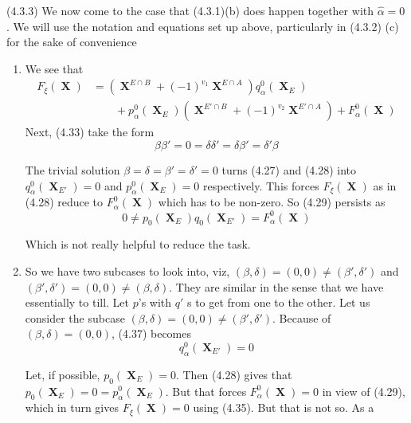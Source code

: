 \documentclass[a4paper,12pt]{article}
\DeclareMathOperator{\x}{\mathrm{X}}
\theoremstyle{definition}
\theoremstyle{underlinethm}
\theoremstyle{definition}
\begin{document}
\begin{enumerate}[label=(\alph*)]
(4.3.3) We now come to the case that (4.3.1)(b) does happen together with $\hat{\alpha} =0$. We will use the notation and equations set up above, particularly in (4.3.2) (c) for the sake of convenience 
\begin{enumerate}[label=(\alph*)]
\item We see that
\begin{align*}
F_{\xi}(\boldsymbol{\x})& = \left(\boldsymbol{\x}^{E \cap B}  + (-1)^{v_{1}} \boldsymbol{\x}^{E \cap A}\right) q_{\alpha}^{0} (\boldsymbol{\x}_{E})\\
 &\qquad + p_{\alpha}^{0} (\boldsymbol{\x}_{E}) (\boldsymbol{\x}^{E' \cap B} + (-1)^{v_{2}} \boldsymbol{\x}^{E' \cap A}) + F_{\alpha}^{0}(\boldsymbol{\x})\tag{4.35}\label{eq-4.35}
\end{align*}
 Next, (4.33) take the form
 \begin{equation}
 \beta\beta' = 0 = \delta\delta' = \delta \beta' = \delta'\beta\tag{4.36}\label{eq-4.36}
 \end{equation}

The trivial solution $\beta = \delta = \beta' = \delta' = 0$ turns  (4.27) and (4.28) into $q_{\alpha}^{0} (\boldsymbol{\x}_{E'}) = 0$ and $p_{\alpha}^{0}(\boldsymbol{\x}_{E})=0$ respectively. This forces $F_{\xi}(\boldsymbol{\x})$ as in (4.28) reduce to $F_{\alpha}^{0}(\boldsymbol{\x})$ which has to be non-zero. So (4.29) persists as
\begin{equation}
0 \neq p_{0}(\boldsymbol{\x}_{E}) q_{0}(\boldsymbol{\x}_{E'}) = F_{\alpha}^{0}(\boldsymbol{\x})\tag{4.37}\label{eq-4.37}
\end{equation}

Which is not really helpful to reduce the task.

\item So we have two subcases to look into, viz, $(\beta, \delta) =(0,0) \neq (\beta', \delta')$ and $(\beta', \delta') = (0,0) \neq (\beta, \delta)$. They are similar in the sense that we have essentially to till. Let $p$'s with $q'$ s to get from one to the other. Let us consider the subcase $(\beta, \delta) =(0,0) \neq (\beta', \delta')$. Because of $(\beta, \delta) = (0,0)$, (4.37) becomes 
\begin{equation}
q_{\alpha}^{0}(\boldsymbol{\x}_{E'})= 0\tag{4.38}\label{eq-4.38}
\end{equation}  

Let, if possible, $p_{0}(\boldsymbol{\x}_{E})=0$. Then (4.28) gives that $p_{0}(\boldsymbol{\x}_{E})=0 = p_{\alpha}^{0}(\boldsymbol{\x}_{E})$. But that forces $F_{\alpha}^{0}(\boldsymbol{\x})=0$ in view of (4.29), which in turn gives $F_{\xi}(\boldsymbol{\x})=0$ using (4.35). But that is not so. As a


\end{enumerate}
\end{enumerate}
\end{document}
